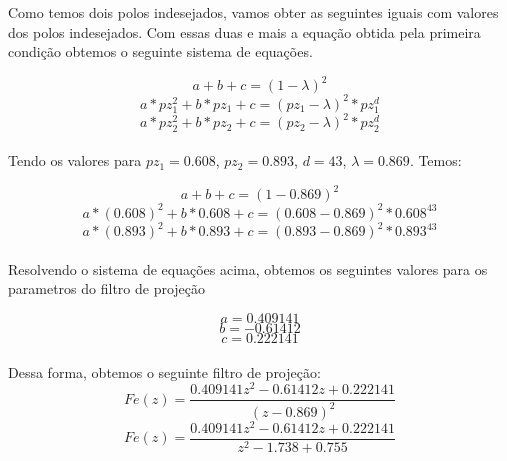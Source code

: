 \documentclass[a4paper,12pt]{article}
\begin{document}
Como temos dois polos indesejados, vamos obter as seguintes iguais com valores dos polos indesejados. Com essas duas e mais a equação obtida pela primeira condição obtemos o seguinte sistema de equações.

\begin{equation}
a + b + c = (1 - \lambda)^2
\end{equation}
\begin{equation}
a * pz^2_1 + b * pz_1 + c = (pz_1 - \lambda)^2 * pz^d_1
\end{equation}
\begin{equation}
a * pz^2_2 + b * pz_2 + c = (pz_2 - \lambda)^2 * pz^d_2
\end{equation}\\


Tendo os valores para $pz_1 = 0.608$, $pz_2 = 0.893$, $d = 43$, $\lambda = 0.869$. Temos:


\begin{equation}
a + b + c = (1 - 0.869)^2
\end{equation}
\begin{equation}
a * (0.608)^2 + b * 0.608  + c = (0.608 - 0.869)^2 * 0.608^{43}
\end{equation}
\begin{equation}
a * (0.893)^2 + b * 0.893  + c = (0.893 - 0.869)^2 * 0.893^{43}
\end{equation}\\

Resolvendo o sistema de equações acima, obtemos os seguintes valores para os parametros do filtro de projeção

\begin{equation}
a =  0.409141
\end{equation}
\begin{equation}
b = -0.61412
\end{equation}
\begin{equation}
c = 0.222141
\end{equation}\\

Dessa forma, obtemos o seguinte filtro de projeção:\\

\begin{equation}
Fe(z) = \frac{0.409141z^2 - 0.61412z + 0.222141}{(z-0.869)^2}
\end{equation}
\begin{equation}
Fe(z) = \frac{0.409141z^2 - 0.61412z + 0.222141}{z^2 - 1.738 + 0.755}
\end{equation}\\
\end{document}
